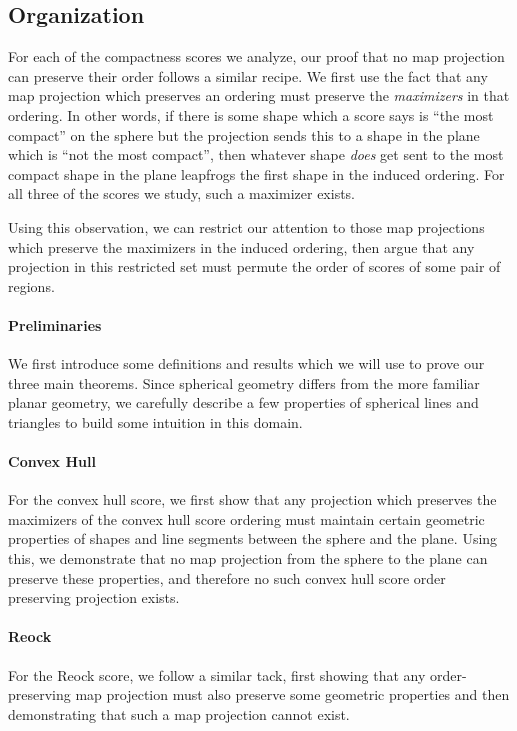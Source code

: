 \subsection{Organization}


For each of the compactness scores we analyze, our proof that no map
projection can preserve their order follows a similar recipe. We
first use the fact that any map projection which preserves an ordering
must preserve the \textit{maximizers} in that ordering.  In other words,
if there is some shape which a score says is \enquote{the most compact} on the sphere 
but the projection sends this to a shape in the plane which is \enquote{not the most compact}, then whatever 
shape \textit{does} get sent to the most compact shape in the plane leapfrogs 
the first shape in the induced ordering.  For all three of the scores we study, such a maximizer exists.

Using this observation, we can restrict our attention to those map
projections which preserve the maximizers in the induced ordering,
then argue that any projection in this restricted set must permute the
order of scores of some pair of regions.


\paragraph{Preliminaries}
We first introduce some definitions and results which we will use to prove our 
three main theorems.  Since spherical geometry differs from the more familiar planar geometry, 
we carefully describe a few properties of spherical lines and triangles to build some intuition 
in this domain. 


\paragraph{Convex Hull}
For the convex hull score, we first 
show that any projection which preserves the maximizers of the convex hull score 
ordering must maintain certain geometric properties of shapes and line segments 
between the sphere and the plane.  Using this, we demonstrate that no 
map projection from the sphere to the plane can preserve these properties, and therefore 
no such convex hull score order preserving projection exists.



\paragraph{Reock}
For the Reock score, we follow a similar tack, first showing that any 
order-preserving map projection must also preserve some geometric properties 
and then demonstrating that such a map projection cannot exist.





